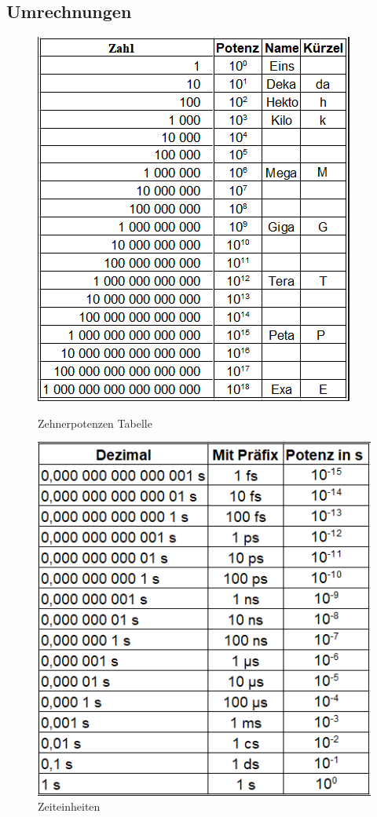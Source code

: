 \subsection{Umrechnungen}
\begin{figure}[h!]
	\centering
	\begin{minipage}[t]{0.5\textwidth}
		\centering
		\includegraphics[width=0.9\linewidth]{images/zehnerpotenzen}
		\caption{Zehnerpotenzen Tabelle}
		\label{fig:zehnerpotenzen}
	\end{minipage}
	\begin{minipage}[t]{0.5\textwidth}
		\centering
		\includegraphics[width=0.9\linewidth]{images/sekundeneinheiten}
		\caption{Zeiteinheiten}
		\label{fig:zeiteinheiten}
	\end{minipage}
\end{figure}

